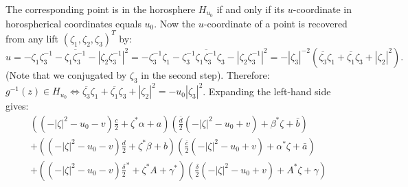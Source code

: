 \documentclass{article}[12pt]
\begin{document}
The corresponding point is in the horosphere $H_{u_0}$ if and only if its $u$-coordinate in horospherical coordinates equals $u_0$. Now the $u$-coordinate of a point is recovered from any lift $(\zeta_1,\zeta_2,\zeta_3)^T$ by: 
$$u=-\zeta_1\zeta_3^{-1} - \overline{\zeta_1 \zeta_3^{-1}}- |\zeta_2 \zeta_3^{-1}|^2=-\zeta_3^{-1}\zeta_1 - \zeta_3^{-1}\overline{\zeta_1 \zeta_3^{-1}}\zeta_3 - |\zeta_2 \zeta_3^{-1}|^2=-|\zeta_3|^{-2}(\overline{\zeta_3}\zeta_1+ \overline{\zeta_1}\zeta_3 +|\zeta_2|^2).$$
(Note that we conjugated by $\zeta_3$ in the second step). Therefore: $g^{-1}(z) \in H_{u_0} \iff \overline{\zeta_3}\zeta_1+\overline{\zeta_1}\zeta_3 +|\zeta_2|^2 = -u_0 |\zeta_3|^2$. Expanding the left-hand side gives:
\begin{eqnarray*}
\left( (-|\zeta|^2-u_0-v) \frac{c}{2}+\zeta^*\alpha+a   \right) \left( \frac{\bar{d}}{2}(-|\zeta|^2-u_0+v)+\beta^*\zeta+\bar{b} \right)    \\
 + \left( (-|\zeta|^2-u_0-v)\frac{d}{2}+\zeta^*\beta+b \right) \left( \frac{\bar{c}}{2}(-|\zeta|^2-u_0+v)+\alpha^*\zeta+\bar{a}   \right)  \\
 +\left( (-|\zeta|^2-u_0-v) \frac{\delta}{2}^*+\zeta^*A+\gamma^* \right)\left( \frac{\delta}{2}(-|\zeta|^2-u_0+v)+A^*\zeta+\gamma \right) 
\end{eqnarray*}
\end{document}
